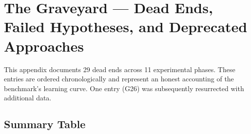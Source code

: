 \section{The Graveyard --- Dead Ends, Failed Hypotheses, and Deprecated Approaches}\label{appendix-c-the-graveyard-dead-ends-failed-hypotheses-and-deprecated-approaches}

This appendix documents 29 dead ends across 11 experimental phases. These entries are ordered chronologically and represent an honest accounting of the benchmark's learning curve. One entry (G26) was subsequently resurrected with additional data.

\subsection{Summary Table}\label{summary-table}

